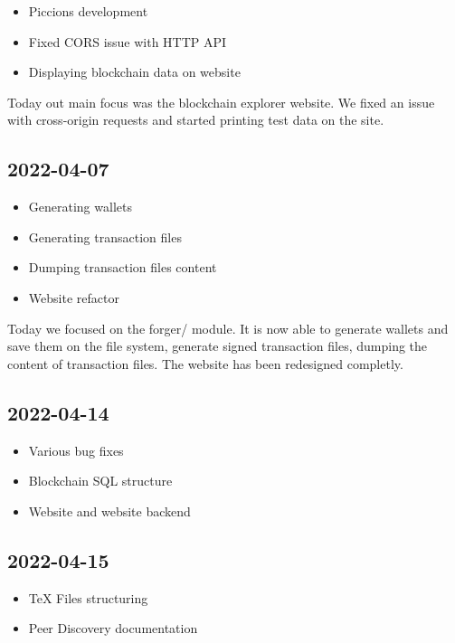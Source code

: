 \documentclass{article}
\begin{document}
\begin{itemize}
    \item Piccions development
    \item Fixed CORS issue with HTTP API
    \item Displaying blockchain data on website
\end{itemize}

Today out main focus was the blockchain explorer website.
We fixed an issue with cross-origin requests and started printing test data
on the site.

\subsection*{2022-04-07}

\begin{itemize}
    \item Generating wallets
    \item Generating transaction files
    \item Dumping transaction files content
    \item Website refactor
\end{itemize}

Today we focused on the forger/ module. It is now able
to generate wallets and save them on the file system, generate 
signed transaction files, dumping the content of transaction files.
The website has been redesigned completly.

\subsection*{2022-04-14}

\begin{itemize}
    \item Various bug fixes
    \item Blockchain SQL structure
    \item Website and website backend
\end{itemize}

\subsection*{2022-04-15}

\begin{itemize}
    \item TeX Files structuring
    \item Peer Discovery documentation
\end{itemize}
\end{document}
